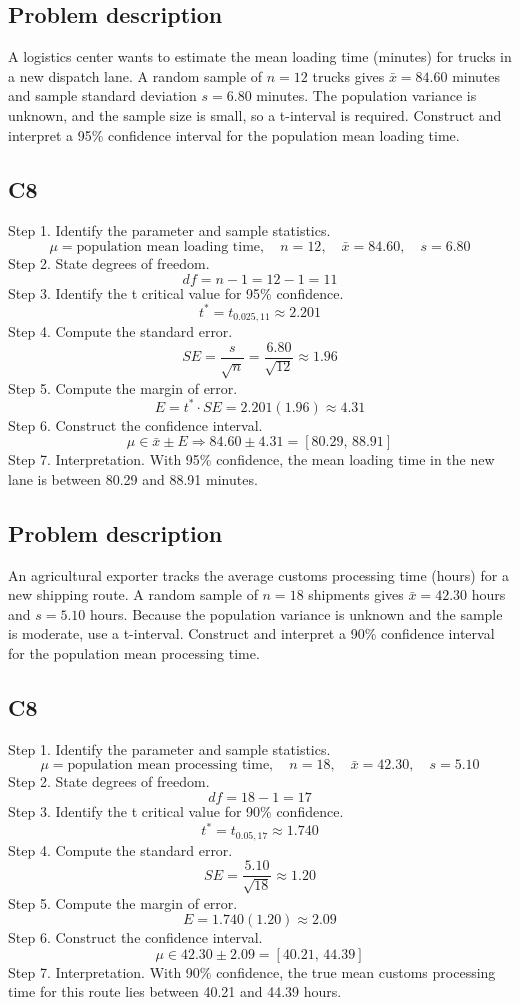 	\begin{ExamProblems}
		\item
		\subsection*{Problem description}
		A logistics center wants to estimate the mean loading time (minutes) for trucks in a new dispatch lane.
		A random sample of $n=12$ trucks gives $\bar{x}=84.60$ minutes and sample standard deviation $s=6.80$ minutes.
		The population variance is unknown, and the sample size is small, so a t-interval is required.
		Construct and interpret a 95\% confidence interval for the population mean loading time.
		
		\subsection*{C8}
		Step 1.
		Identify the parameter and sample statistics.
		\[
		\mu=\text{population mean loading time},\quad n=12,\quad \bar{x}=84.60,\quad s=6.80
		\]
		Step 2.
		State degrees of freedom.
		\[
		df=n-1=12-1=11
		\]
		Step 3.
		Identify the t critical value for 95\% confidence.
		\[
		t^*=t_{0.025,11}\approx 2.201
		\]
		Step 4.
		Compute the standard error.
		\[
		SE=\frac{s}{\sqrt{n}}=\frac{6.80}{\sqrt{12}}\approx 1.96
		\]
		Step 5.
		Compute the margin of error.
		\[
		E=t^*\cdot SE=2.201(1.96)\approx 4.31
		\]
		Step 6.
		Construct the confidence interval.
		\[
		\mu\in\bar{x}\pm E\Rightarrow 84.60\pm 4.31=[80.29,\,88.91]
		\]
		Step 7.
		Interpretation.
		With 95\% confidence, the mean loading time in the new lane is between 80.29 and 88.91 minutes.
		
		\newpage
		\item
		\subsection*{Problem description}
		An agricultural exporter tracks the average customs processing time (hours) for a new shipping route.
		A random sample of $n=18$ shipments gives $\bar{x}=42.30$ hours and $s=5.10$ hours.
		Because the population variance is unknown and the sample is moderate, use a t-interval.
		Construct and interpret a 90\% confidence interval for the population mean processing time.
		
		\subsection*{C8}
		Step 1.
		Identify the parameter and sample statistics.
		\[
		\mu=\text{population mean processing time},\quad n=18,\quad \bar{x}=42.30,\quad s=5.10
		\]
		Step 2.
		State degrees of freedom.
		\[
		df=18-1=17
		\]
		Step 3.
		Identify the t critical value for 90\% confidence.
		\[
		t^*=t_{0.05,17}\approx 1.740
		\]
		Step 4.
		Compute the standard error.
		\[
		SE=\frac{5.10}{\sqrt{18}}\approx 1.20
		\]
		Step 5.
		Compute the margin of error.
		\[
		E=1.740(1.20)\approx 2.09
		\]
		Step 6.
		Construct the confidence interval.
		\[
		\mu\in 42.30\pm 2.09=[40.21,\,44.39]
		\]
		Step 7.
		Interpretation.
		With 90\% confidence, the true mean customs processing time for this route lies between 40.21 and 44.39 hours.
		

\end{ExamProblems}
